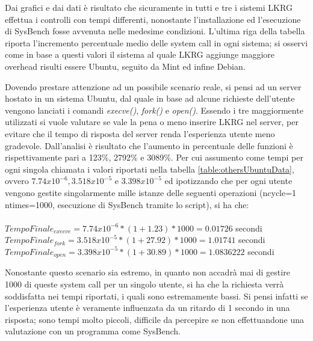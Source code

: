 Dai grafici e dai dati è risultato che sicuramente in tutti e tre i sistemi LKRG effettua i controlli con tempi differenti, nonostante l'installazione ed l'esecuzione di SysBench fosse avvenuta nelle medesime condizioni. L'ultima riga della tabella riporta l'incremento percentuale medio delle system call in ogni sistema; si osservi come in base a questi valori il sistema al quale LKRG aggiunge maggiore overhead risulti essere Ubuntu, seguito da Mint ed infine Debian.

Dovendo prestare attenzione ad un possibile scenario reale, si pensi ad un server hostato in un sistema Ubuntu, dal quale in base ad alcune richieste dell'utente vengono lanciati i comandi \emph{execve()}, \emph{fork()} e \emph{open()}. Essendo i tre maggiormente utilizzati si vuole valutare se vale la pena o meno inserire LKRG nel server, per evitare che il tempo di risposta del server renda l'esperienza utente meno gradevole. Dall'analisi è risultato che l'aumento in percentuale delle funzioni è rispettivamente pari a 123\%, 2792\% e 3089\%. Per cui assumento come tempi per ogni singola chiamata i valori riportati nella tabella \autoref{table:othersUbuntuData}, ovvero $7.74x10^{-6}, 3.518x10^{-5}$ e $3.398x10^{-5}$ ed ipotizzando che per ogni utente vengono gestite singolarmente mille istanze delle seguenti operazioni (ncycle=1 ntimes=1000, esecuzione di SysBench tramite lo script), si ha che:\\\\
$TempoFinale_{execve} = 7.74x10^{-6} * (1 + 1.23) * 1000 = 0.01726$ secondi\\
$TempoFinale_{fork} = 3.518x10^{-5} * (1 + 27.92) * 1000 = 1.01741$ secondi\\
$TempoFinale_{open} = 3.398x10^{-5} * (1 + 30.89) * 1000 = 1.0836222$ secondi
\\\par

Nonostante questo scenario sia estremo, in quanto non accadrà mai di gestire 1000 di queste system call per un singolo utente, si ha che la richiesta verrà soddisfatta nei tempi riportati, i quali sono estremamente bassi. Si pensi infatti se l'esperienza utente è veramente influenzata da un ritardo di 1 secondo in una risposta; sono tempi molto piccoli, difficile da percepire se non effettuandone una valutazione con un programma come SysBench.